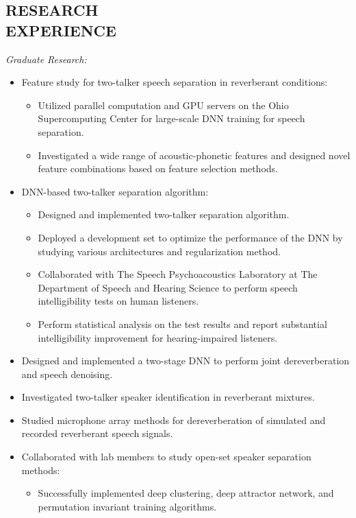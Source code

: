 \documentclass[margin, 10pt]{res}
\begin{document}
\begin{resume}
\section{RESEARCH \\ EXPERIENCE}
\textit{Graduate Research:}
\begin{itemize}\setlength\itemsep{-0.3em}
\item Feature study for two-talker speech separation in reverberant conditions:
	\begin{itemize}\setlength\itemsep{-0.3em}
	\item Utilized parallel computation and GPU servers on the Ohio Supercomputing Center for large-scale DNN training for speech separation.
	\item Investigated a wide range of acoustic-phonetic features and designed novel feature combinations based on feature selection methods.
	\end{itemize}
\item DNN-based two-talker separation algorithm:
	\begin{itemize}\setlength\itemsep{-0.3em}
	\item Designed and implemented two-talker separation algorithm.
	\item Deployed a development set to optimize the performance of the DNN by studying various architectures and regularization method.
	\item Collaborated with The Speech Psychoacoustics Laboratory at The Department of Speech and Hearing Science to perform speech intelligibility tests on human listeners.
	\item Perform statistical analysis on the test results and report substantial intelligibility improvement for hearing-impaired listeners.
	\end{itemize}
\item Designed and implemented a two-stage DNN to perform joint dereverberation and speech denoising.
\item Investigated two-talker speaker identification in reverberant mixtures.
\item Studied microphone array methods for dereverberation of simulated and recorded reverberant speech signals.
\item Collaborated with lab members to study open-set speaker separation methods:
	\begin{itemize}\setlength\itemsep{-0.3em}
	\item Successfully implemented deep clustering, deep attractor network, and permutation invariant training algorithms.

\end{itemize}
\end{itemize}
\end{resume}
\end{document}
